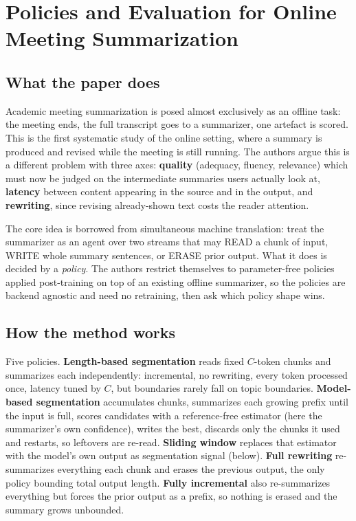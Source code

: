 \section{Policies and Evaluation for Online Meeting Summarization}

\subsection{What the paper does}

Academic meeting summarization is posed almost exclusively as an offline task: the meeting ends, the full transcript goes to a summarizer, one artefact is scored. This is the first systematic study of the online setting, where a summary is produced and revised while the meeting is still running. The authors argue this is a different problem with three axes: \textbf{quality} (adequacy, fluency, relevance) which must now be judged on the intermediate summaries users actually look at, \textbf{latency} between content appearing in the source and in the output, and \textbf{rewriting}, since revising already-shown text costs the reader attention.

The core idea is borrowed from simultaneous machine translation: treat the summarizer as an agent over two streams that may READ a chunk of input, WRITE whole summary sentences, or ERASE prior output. What it does is decided by a \emph{policy}. The authors restrict themselves to parameter-free policies applied post-training on top of an existing offline summarizer, so the policies are backend agnostic and need no retraining, then ask which policy shape wins.

\subsection{How the method works}

Five policies. \textbf{Length-based segmentation} reads fixed $C$-token chunks and summarizes each independently: incremental, no rewriting, every token processed once, latency tuned by $C$, but boundaries rarely fall on topic boundaries. \textbf{Model-based segmentation} accumulates chunks, summarizes each growing prefix until the input is full, scores candidates with a reference-free estimator (here the summarizer's own confidence), writes the best, discards only the chunks it used and restarts, so leftovers are re-read. \textbf{Sliding window} replaces that estimator with the model's own output as segmentation signal (below). \textbf{Full rewriting} re-summarizes everything each chunk and erases the previous output, the only policy bounding total output length. \textbf{Fully incremental} also re-summarizes everything but forces the prior output as a prefix, so nothing is erased and the summary grows unbounded.

